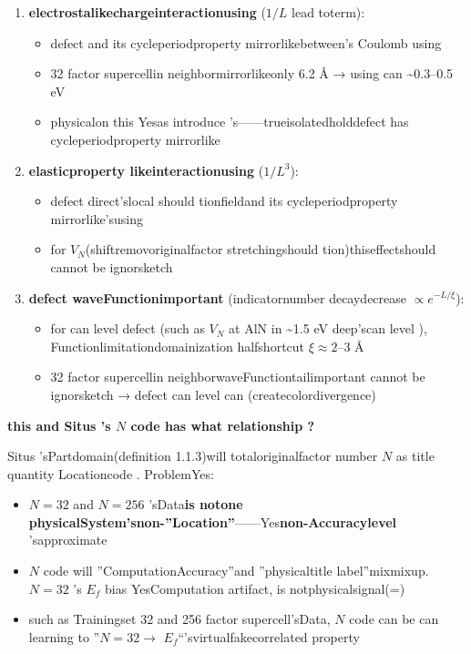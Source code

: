 \documentclass[
  12pt,
]{article}
\providecommand{\tightlist}{%
  \setlength{\itemsep}{0pt}\setlength{\parskip}{0pt}}
\begin{document}
\begin{enumerate}
\def\labelenumi{\arabic{enumi}.}
\tightlist
\item
  \textbf{electrostalikechargeinteractionusing }(\(1/L\) lead toterm):

  \begin{itemize}
  \tightlist
  \item
     defect and its cycleperiodproperty mirrorlikebetween's Coulomb using 
  \item
    32 factor supercellin neighbormirrorlikeonly  6.2 Å → using can  \textasciitilde0.3--0.5
    eV
  \item
    physicalon this Yesas introduce 's------trueisolatedholddefect has cycleperiodproperty mirrorlike
  \end{itemize}
\item
  \textbf{elasticproperty likeinteractionusing }(\(1/L^3\)):

  \begin{itemize}
  \tightlist
  \item
    defect direct'slocal should tionfieldand its cycleperiodproperty mirrorlike'susing 
  \item
    for  \(V_N\)(shiftremovoriginalfactor stretchingshould tion)thiseffectshould cannot be ignorsketch
  \end{itemize}
\item
  \textbf{defect waveFunctionimportant }(indicatornumber decaydecrease \(\propto e^{-L/\xi}\)):

  \begin{itemize}
  \tightlist
  \item
    for can level defect (such as  \(V_N\) at  AlN in  \textasciitilde1.5 eV
    deep'scan level ), Functionlimitationdomainization halfshortcut \(\xi \approx 2\)--\(3\) Å
  \item
    32 factor supercellin neighborwaveFunctiontailimportant cannot be ignorsketch →
    defect can level can  (createcolordivergence)
  \end{itemize}
\end{enumerate}

\textbf{this and  Situs 's \(N\) code has what relationship ?}

Situs 'sPartdomain(definition  1.1.3)will totaloriginalfactor number  \(N\)
as title quantity Locationcode  . ProblemYes: 

\begin{itemize}
\tightlist
\item
  \(N=32\) and  \(N=256\)
  'sData\textbf{is notone physicalSystem'snon-''Location''}------Yes\textbf{non-Accuracylevel }'sapproximate 
\item
  \(N\) code will ''ComputationAccuracy''and ''physicaltitle label''mixmixup. \(N=32\) 's \(E_f\)
  bias YesComputation artifact, is notphysicalsignal(=)
\item
  such as Trainingset  32 and  256 factor supercell'sData, \(N\)
  code can be can learning to ''\(N=32 \to\)  \(E_f\)``'svirtualfakecorrelated property 
\end{itemize}
\end{document}
